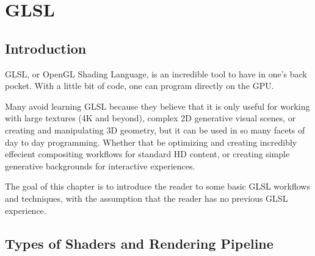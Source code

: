 \cleardoublepage
\chapter{GLSL}
\label{ch:12}
 

\section{Introduction}

\begin{fullwidth}
GLSL, or OpenGL Shading Language, is an incredible tool to have in one's back pocket. With a little bit of code, one can program directly on the GPU. 

Many avoid learning GLSL because they believe that it is only useful for working with large textures (4K and beyond), complex 2D generative visual scenes, or creating and manipulating 3D geometry, but it can be used in so many facets of day to day programming. Whether that be optimizing and creating incredibly effecient compositing workflows for standard HD content, or creating simple generative backgrounds for interactive experiences. 

The goal of this chapter is to introduce the reader to some basic GLSL workflows and techniques, with the assumption that the reader has no previous GLSL experience. 

\end{fullwidth}


\section{Types of Shaders and Rendering Pipeline}


